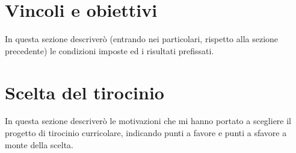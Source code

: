 \section{Vincoli e obiettivi}

In questa sezione descriverò (entrando nei particolari, rispetto alla sezione precedente) le condizioni imposte ed i risultati prefissati.

\section{Scelta del tirocinio}

In questa sezione descriverò le motivazioni che mi hanno portato a scegliere il progetto di tirocinio curricolare, indicando punti a favore e punti a sfavore a monte della scelta.
